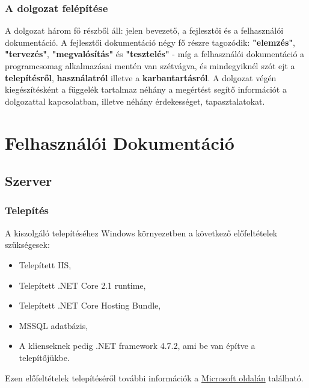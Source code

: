 \documentclass[twoside, a4paper, 12pt]{book}
\begin{document}
\section{A dolgozat felépítése}
A dolgozat három fő részből áll: jelen bevezető, a fejlesztői és a felhasználói dokumentáció.
A fejlesztői dokumentáció négy fő részre tagozódik: \textbf{"elemzés"}, \textbf{"tervezés"}, \textbf{"megvalósítás"} és \textbf{"tesztelés"} - míg a felhasználói dokumentáció a programcsomag alkalmazásai mentén van szétvágva, és mindegyiknél szót ejt a \textbf{telepítésről}, \textbf{használatról} illetve a \textbf{karbantartásról}.
A dolgozat végén kiegészítésként a függelék tartalmaz néhány a megértést segítő információt a dolgozattal kapcsolatban, illetve néhány érdekességet, tapasztalatokat.










































\newpage
\part{Felhasználói Dokumentáció}

\chapter{Szerver}
\section{Telepítés}
A kiszolgáló telepítéséhez Windows környezetben a következő előfeltételek szükségesek:
\begin{itemize}
	\item Telepített IIS,
	\item Telepített .NET Core 2.1 runtime,
	\item Telepített .NET Core Hosting Bundle,
	\item MSSQL adatbázis,
	\item A klienseknek pedig .NET framework 4.7.2, ami be van építve a telepítőjükbe.
\end{itemize}
Ezen előfeltételek telepítéséről további információk a \href{https://docs.microsoft.com/en-us/aspnet/core/host-and-deploy/iis/?view=aspnetcore-2.2}{Microsoft oldalán} található.
\end{document}
